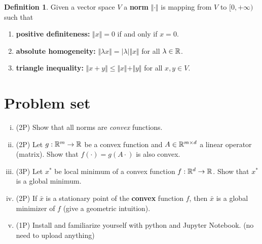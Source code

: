 \documentclass{scrartcl}
\theoremstyle{definition}
\newtheorem{definition}{Definition}[section]
\begin{document}
\begin{definition}
  Given a vector space $V$ a \textbf{norm} $\Vert \cdot \Vert$ is mapping from $V$ to $[0, +\infty)$ such that
  \begin{enumerate}
    \item \textbf{positive definiteness:} $\Vert x \Vert = 0$ if and only if $x=0$.
    \item \textbf{absolute homogeneity:} $\Vert \lambda x \Vert = \vert \lambda \vert \Vert x \Vert$ for all $\lambda \in \mathbb{R}$.
      \item \textbf{triangle inequality:} $\Vert x+y \Vert \le \Vert x \Vert + \Vert y \Vert$ for all $x,y \in V$.
  \end{enumerate}
\end{definition}

\section{Problem set}%

\begin{enumerate}[(i)]
  \item (2P) Show that all norms are \emph{convex} functions.
  \item (2P) Let $g: \mathbb{R}^m \to \mathbb{R}$ be a convex function and $A \in \mathbb{R}^{m \times d}$ a linear operator (matrix). Show that $f(\cdot) = g(A \cdot)$ is also convex.
  \item (3P) Let $x^*$ be local minimum of a convex function $f:\mathbb{R}^d\to \mathbb{R}$. Show that $x^*$ is a global minimum.
  \item (2P) If $\bar{x}$ is a stationary point of the \textbf{convex} function $f$, then $\bar{x}$ is a global minimizer of $f$ (give a geometric intuition).
  \item (1P) Install and familiarize yourself with python and Jupyter Notebook. (no need to upload anything)
\end{enumerate}
\end{document}
